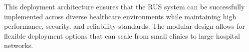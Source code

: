 This deployment architecture ensures that the RUS system can be successfully implemented across diverse healthcare environments while maintaining high performance, security, and reliability standards. The modular design allows for flexible deployment options that can scale from small clinics to large hospital networks.
